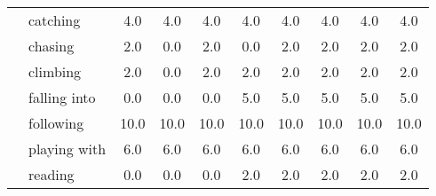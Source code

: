 \begin{table}[ht!]
\begin{tabular}{|c|l|c|c|c|c|c|c|c|c|}
		\multirow{11}{*}{\rotatebox[origin=c]{90}{chybějící vazby typu}}  & {catching}                                  & 4.0        & 4.0        & 4.0        & 4.0        & 4.0         & 4.0         & 4.0         & 4.0   \\
		                                                                  & {chasing}                                   & 2.0        & 0.0        & 2.0        & 0.0        & 2.0         & 2.0         & 2.0         & 2.0   \\
		                                                                  & {climbing}                                  & 2.0        & 0.0        & 2.0        & 2.0        & 2.0         & 2.0         & 2.0         & 2.0   \\
		                                                                  & {falling into}                              & 0.0        & 0.0        & 0.0        & 5.0        & 5.0         & 5.0         & 5.0         & 5.0   \\
		                                                                  & {following}                                 & 10.0       & 10.0       & 10.0       & 10.0       & 10.0        & 10.0        & 10.0        & 10.0  \\
		                                                                  & {playing with}                              & 6.0        & 6.0        & 6.0        & 6.0        & 6.0         & 6.0         & 6.0         & 6.0   \\
		                                                                  & {reading}                                   & 0.0        & 0.0        & 0.0        & 2.0        & 2.0         & 2.0         & 2.0         & 2.0   \\

\end{tabular}
\end{table}
